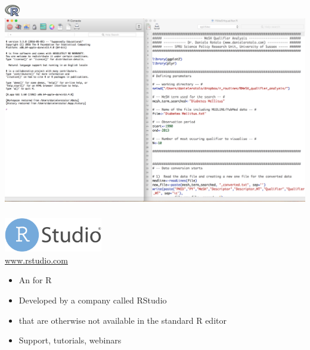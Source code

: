 \documentclass[8pt]{beamer}
\begin{document}

\begin{frame}
\frametitle{\insertsection}

\includegraphics[height=0.5cm]{../_shared_pics/r_logo}\\
\includegraphics[width=\linewidth,frame]{r_interface}

\end{frame}


\begin{frame}
\frametitle{\insertsection}

\begin{center}
    \includegraphics[height=1.5cm]{../_shared_pics/rstudio_logo}\\
    \url{www.rstudio.com}
\end{center}

\medskip
\medskip

\begin{itemize}[<+->]
\item An {\color{blue}{open-source editor}} for R 
\item Developed by a company called RStudio
\item {\color{blue}{Functionalities}} that are otherwise not available in the standard R editor
\item Support, tutorials, webinars 

\end{itemize}

\end{frame}
\end{document}
